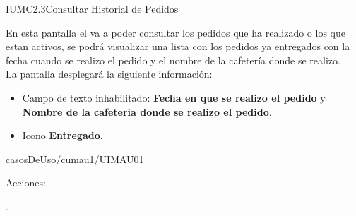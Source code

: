 
\begin{IU}{IUMC2.3}{Consultar Historial de Pedidos}{En esta pantalla el  va a poder consultar los pedidos que ha realizado o los que estan activos, se podrá visualizar una lista con los pedidos ya entregados con la fecha cuando se realizo el pedido y el nombre de la cafetería donde se realizo.\\
		
La pantalla desplegará la siguiente información:
\begin{itemize}
	\item Campo de texto inhabilitado: \textbf{Fecha en que se realizo el pedido} y \textbf{Nombre de la cafeteria donde se realizo el pedido}.
	\item Icono \textbf{Entregado}.
	
\end{itemize}}{casosDeUso/cumau1/UIMAU01}

	\item[Acciones:]\hspace{1pt}
	\begin{Citemize}
		\item \comidaIcon{}.
	\end{Citemize}
\end{IU}
